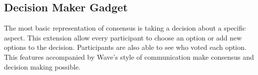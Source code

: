 \subsection{Decision Maker Gadget}

The most basic representation of consensus is taking a decision about a specific aspect. This extension allow every participant to choose an option or add new options to the decision. Participants are also able to see who voted each option. This features accompanied by Wave's style of communication make consensus and decision making possible.
